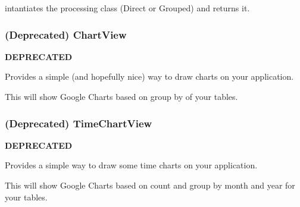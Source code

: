\documentclass[letterpaper,10pt,english]{sphinxmanual}
\begin{document}
\begin{fulllineitems}
\begin{fulllineitems}
\end{fulllineitems}


\begin{fulllineitems}
\label{api:flask.ext.appbuilder.charts.views.GroupByChartView.get_group_by_class}
intantiates the processing class (Direct or Grouped) and returns it.

\end{fulllineitems}


\end{fulllineitems}



\subsubsection{(Deprecated) ChartView}
\label{api:deprecated-chartview}

\begin{fulllineitems}
\label{api:flask.ext.appbuilder.charts.views.ChartView}
\textbf{DEPRECATED}

Provides a simple (and hopefully nice) way to draw charts on your application.

This will show Google Charts based on group by of your tables.

\end{fulllineitems}



\subsubsection{(Deprecated) TimeChartView}
\label{api:deprecated-timechartview}

\begin{fulllineitems}
\label{api:flask.ext.appbuilder.charts.views.TimeChartView}
\textbf{DEPRECATED}

Provides a simple way to draw some time charts on your application.

This will show Google Charts based on count and group by month and year for your tables.

\end{fulllineitems}
\end{document}
